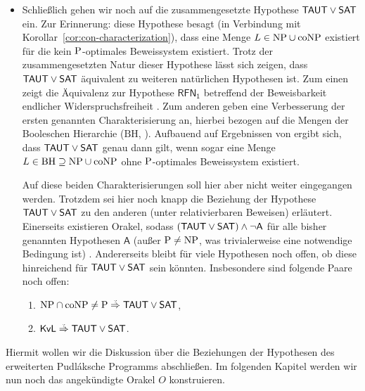 \begin{itemize}[parsep=0pt,listparindent=\parindent,itemsep=5pt plus 1pt minus 1pt,midpenalty=0]
    \item Schließlich gehen wir noch auf die zusammengesetzte Hypothese $\hTAUT\lor\hSAT$ ein. Zur Erinnerung: diese Hypothese besagt (in Verbindung mit Korollar~\ref{cor:con-characterization}), dass eine Menge $L\in\NP\cup\coNP$ existiert für die kein $\P$-optimales Beweissystem existiert.
        Trotz der zusammengesetzten Natur dieser Hypothese lässt sich zeigen, dass $\hTAUT\lor\hSAT$ äquivalent zu weiteren natürlichen Hypothesen ist.
        Zum einen zeigt \textcite[Thm.~3.2]{khaniki_new_2022} die Äquivalenz zur Hypothese $\mathsf{RFN_1}$ betreffend der Beweisbarkeit endlicher Widerspruchsfreiheit \parencites(vgl.)(){pudlak_incompleteness_2017}.
        Zum anderen geben \textcite{egidy_upward_2023} eine Verbesserung der ersten genannten Charakterisierung an, hierbei bezogen auf die Mengen der Booleschen Hierarchie ($\mathrm{BH}$, \cites(vgl.)(){cai_boolean_1986}{cai_boolean_1988}{cai_boolean_1989}). Aufbauend auf Ergebnissen von \textcite{kobler_optimal_2003} ergibt sich, dass $\hTAUT\lor\hSAT$ genau dann gilt, wenn sogar eine Menge $L \in \mathrm{BH}\supseteq \NP\cup\coNP$ ohne $\P$-optimales Beweissystem existiert.

        Auf diese beiden Charakterisierungen soll hier aber nicht weiter eingegangen werden.
        Trotzdem sei hier noch knapp die Beziehung der Hypothese $\hTAUT\lor\hSAT$ zu den anderen (unter relativierbaren Beweisen) erläutert.
        Einerseits existieren Orakel, sodass $(\hTAUT\lor\hSAT)\land \neg\mathsf{A}$ für alle bisher genannten Hypothesen $\mathsf A$ (außer $\P\neq\NP$, was trivialerweise eine notwendige Bedingung ist) . Andererseits bleibt für viele Hypothesen noch offen, ob diese hinreichend für $\hTAUT\lor\hSAT$ sein könnten. Insbesondere sind folgende Paare noch offen:
        \begin{enumerate}[noitemsep,resume,label=(\roman*)]
            \item $\NP\cap\coNP\neq \P\stackrel{\smash{\text{\raisebox{-1pt}{\tiny ?}}}}{\Rightarrow}\hTAUT\lor\hSAT$,
            \item $\mathsf{KvL}\stackrel{\smash{\text{\raisebox{-1pt}{\tiny ?}}}}{\Rightarrow}\hTAUT\lor\hSAT$.
        \end{enumerate}
\end{itemize}

Hiermit wollen wir die Diskussion über die Beziehungen der Hypothesen des erweiterten Pudláksche Programms abschließen. Im folgenden Kapitel werden wir nun noch das angekündigte Orakel $O$ konstruieren.

